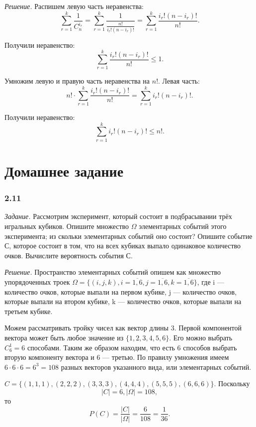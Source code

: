 \documentclass{book}
\begin{document}
\textit{Решение.} Распишем левую часть неравенства:
$$ \sum \limits_{r=1}^k \frac{1}{C_n^{i_r}} =
\sum \limits_{r=1}^k \frac{1}{ \frac{n!}{i_{r}! \left(n-i_r\right)!} } =
\sum \limits_{r=1}^k \frac{i_{r}! \left(n-i_r\right)!}{n!}.$$

Получили неравенство:
$$\sum \limits_{r=1}^k \frac{i_{r}! \left(n-i_r\right)!}{n!} \leq 1.$$

Умножим левую и правую часть неравенства на $n!$.
Левая часть:
$$ n! \cdot \sum \limits_{r=1}^k \frac{i_{r}! \left(n-i_r\right)!}{n!} =
\sum \limits_{r=1}^k i_{r}! \left(n-i_r\right)!.$$

Получили неравенство:
$$\sum \limits_{r=1}^k i_{r}! \left(n-i_r\right)! \leq n!.$$

\section*{Домашнее задание}

\subsubsection*{2.11}

\textit{Задание.} Рассмотрим эксперимент, который состоит в подбрасывании трёх игральных кубиков.
Опишите множество $ \Omega $ элементарных событий этого эксперимента; из скольки элементарных событий оно состоит?
Опишите событие С, которое состоит в том, что на всех кубиках выпало одинаковое количество очков.
Вычислите вероятность события С.

\textit{Решение.} Пространство элементарных событий опишем как множество упорядоченных троек
$ \Omega = \{ \left( i, j, k \right),
i = \overline{ 1, 6 },
j = \overline{ 1, 6 },
k = \overline{ 1, 6 } \} $,
где i --- количество очков, которые выпали на первом кубике,
j --- количество очков, которые выпали на втором кубике,
k --- количество очков, которые выпали на третьем кубике.

Можем рассматривать тройку чисел как вектор длины 3.
Первой компонентой вектора может быть любое значение из $ \{ 1, 2, 3, 4, 5, 6 \} $.
Его можно выбрать $ C_6^1 = 6 $ способами.
Таким же образом находим, что есть 6 способов выбрать вторую компоненту вектора и 6 --- третью.
По правилу умножения имеем $ 6 \cdot 6 \cdot 6 = 6^3 = 108 $ разных векторов указанного вида, или элементарных событий.

$ C = \{ (1, 1, 1), (2, 2, 2), (3, 3, 3), (4, 4, 4), (5, 5, 5), (6, 6, 6) \} $.
Поскольку
$$ |C| = 6,
|\Omega| = 108, $$
то
$$ P(C) =
\frac{ |C| }{ |\Omega| } =
\frac{ 6 }{ 108 } =
\frac{ 1 }{ 36 }.$$
\end{document}
